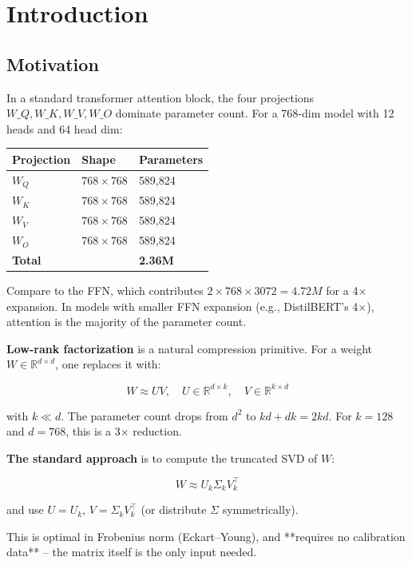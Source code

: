 \section{Introduction}

\subsection{Motivation}

In a standard transformer attention block, the four projections $W\_Q, W\_K, 
W\_V, W\_O$ dominate parameter count. For a 768-dim model with 12 heads and 
64 head dim:

\begin{table}[H]
\centering
\small
\begin{tabular}{lll}
\toprule
\textbf{Projection} & \textbf{Shape} & \textbf{Parameters} \\
\midrule
$W_Q$ & $768 \times 768$ & 589,824 \\
$W_K$ & $768 \times 768$ & 589,824 \\
$W_V$ & $768 \times 768$ & 589,824 \\
$W_O$ & $768 \times 768$ & 589,824 \\
\textbf{Total} &  & \textbf{2.36M} \\
\bottomrule
\end{tabular}
\end{table}

Compare to the FFN, which contributes $2 \times 768 \times 3072 = 4.72M$ for 
a 4$\times$ expansion. In models with smaller FFN expansion (e.g., DistilBERT's 4$\times$), 
attention is the majority of the parameter count.

\textbf{Low-rank factorization} is a natural compression primitive. For a weight 
$W \in \mathbb{R}^{d \times d}$, one replaces it with:

\[
W \approx U V, \quad U \in \mathbb{R}^{d \times k}, \quad V \in \mathbb{R}^{k \times d}
\]

with $k \ll d$. The parameter count drops from $d^2$ to $kd + dk = 2kd$. For 
$k = 128$ and $d = 768$, this is a 3$\times$ reduction.

\textbf{The standard approach} is to compute the truncated SVD of $W$:

\[
W \approx U_k \Sigma_k V_k^\top
\]

and use $U = U_k$, $V = \Sigma_k V_k^\top$ (or distribute $\Sigma$ symmetrically).

This is optimal in Frobenius norm (Eckart--Young), and **requires no calibration 
data** -- the matrix itself is the only input needed.

